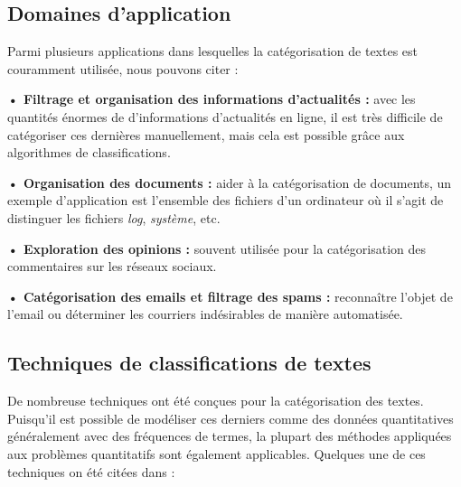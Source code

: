     \subsection{Domaines d'application}
    Parmi plusieurs applications dans lesquelles la catégorisation de textes est couramment utilisée, nous pouvons citer :

    \textbf{• Filtrage et organisation des informations d'actualités :} avec les quantités énormes de d'informations d'actualités en ligne, il est très difficile de catégoriser ces dernières manuellement, mais cela est possible grâce aux algorithmes de classifications. 

    \textbf{• Organisation des documents :} aider à la catégorisation de documents, un exemple d'application est l'ensemble des fichiers d'un ordinateur où il s'agit de distinguer les fichiers \emph{log}, \emph{système}, etc.

    \textbf{• Exploration des opinions :} souvent utilisée pour la catégorisation des commentaires sur les réseaux sociaux.

    \textbf{• Catégorisation des emails et filtrage des spams :} reconnaître l'objet de l'email ou déterminer les courriers indésirables de manière automatisée.
     
    \subsection{Techniques de classifications de textes}
    De nombreuse techniques ont été conçues pour la catégorisation des textes. Puisqu'il est possible de modéliser ces derniers comme des données quantitatives généralement avec des fréquences de termes, la plupart des méthodes appliquées aux problèmes quantitatifs sont également applicables. Quelques une de ces techniques on été citées dans \cite{stca} :

